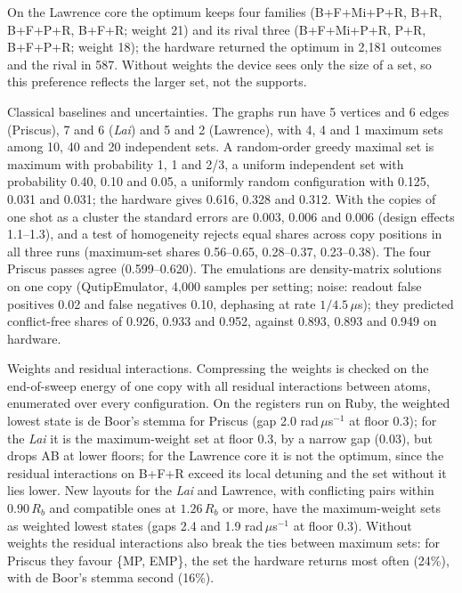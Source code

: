 \documentclass[11pt,a4paper]{article}
\theoremstyle{remark}
\begin{document}
On the Lawrence core the optimum keeps four families (B+F+Mi+P+R, B+R, B+F+P+R, B+F+R; weight 21) and its rival three (B+F+Mi+P+R, P+R, B+F+P+R; weight 18); the hardware returned the optimum in 2{,}181 outcomes and the rival in 587. Without weights the device sees only the size of a set, so this preference reflects the larger set, not the supports.

Classical baselines and uncertainties. The graphs run have 5 vertices and 6 edges (Priscus), 7 and 6 (\emph{Lai}) and 5 and 2 (Lawrence), with 4, 4 and 1 maximum sets among 10, 40 and 20 independent sets. A random-order greedy maximal set is maximum with probability 1, 1 and 2/3, a uniform independent set with probability 0.40, 0.10 and 0.05, a uniformly random configuration with 0.125, 0.031 and 0.031; the hardware gives 0.616, 0.328 and 0.312. With the copies of one shot as a cluster the standard errors are 0.003, 0.006 and 0.006 (design effects 1.1--1.3), and a test of homogeneity rejects equal shares across copy positions in all three runs (maximum-set shares 0.56--0.65, 0.28--0.37, 0.23--0.38). The four Priscus passes agree (0.599--0.620). The emulations are density-matrix solutions on one copy (QutipEmulator, 4{,}000 samples per setting; noise: readout false positives 0.02 and false negatives 0.10, dephasing at rate $1/4.5\,\mu$s); they predicted conflict-free shares of 0.926, 0.933 and 0.952, against 0.893, 0.893 and 0.949 on hardware.

Weights and residual interactions. Compressing the weights is checked on the end-of-sweep energy of one copy with all residual interactions between atoms, enumerated over every configuration. On the registers run on Ruby, the weighted lowest state is de Boor's stemma for Priscus (gap 2.0 rad\,$\mu$s$^{-1}$ at floor 0.3); for the \emph{Lai} it is the maximum-weight set at floor 0.3, by a narrow gap (0.03), but drops AB at lower floors; for the Lawrence core it is not the optimum, since the residual interactions on B+F+R exceed its local detuning and the set without it lies lower. New layouts for the \emph{Lai} and Lawrence, with conflicting pairs within $0.90\,R_b$ and compatible ones at $1.26\,R_b$ or more, have the maximum-weight sets as weighted lowest states (gaps 2.4 and 1.9 rad\,$\mu$s$^{-1}$ at floor 0.3). Without weights the residual interactions also break the ties between maximum sets: for Priscus they favour \{MP, EMP\}, the set the hardware returns most often (24\%), with de Boor's stemma second (16\%).
\end{document}

